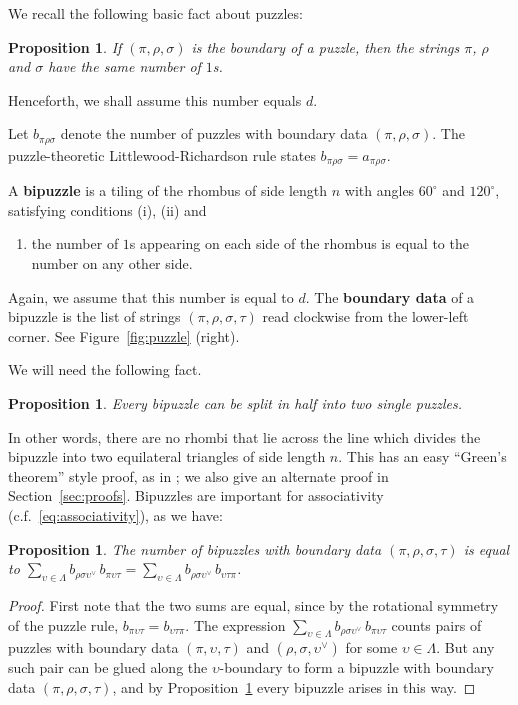 \documentclass[12pt]{article}
\newtheorem{proposition}[lemma]{Proposition}
\begin{document}
We recall the following basic fact about puzzles:
\begin{proposition}
If $(\pi, \rho, \sigma)$ is the boundary of a puzzle, then the
strings $\pi$, $\rho$ and $\sigma$ have the same number of $1$s.
\end{proposition}
Henceforth, we shall assume this number equals $d$.

Let $b_{\pi \rho \sigma}$ denote the number of puzzles with
boundary data $(\pi, \rho, \sigma)$.  The puzzle-theoretic
Littlewood-Richardson rule states
$b_{\pi \rho \sigma} = a_{\pi \rho \sigma}$.

A {\bf bipuzzle} is a tiling of the rhombus of side length
$n$ with angles $60^\circ$ and $120^\circ$, satisfying conditions
(i), (ii) and
\begin{enumerate}
\item[(iii)] the number of $1$s appearing on each side of the rhombus 
is equal to the number on any other side.
\end{enumerate}
Again, we assume that this number is equal to $d$.  
The {\bf boundary data} of a bipuzzle is the list of strings
$(\pi, \rho, \sigma, \tau)$ read clockwise from the lower-left
corner.  See Figure~\ref{fig:puzzle} (right).

We will need the following fact.
\begin{proposition}
\label{prop:bisplit}
Every bipuzzle can be split in half into two single puzzles.
\end{proposition}

In other words, there are no rhombi that lie across the line which 
divides the bipuzzle into two equilateral triangles of side length
$n$.  This has an easy ``Green's theorem'' style proof, as in 
\cite[Lemma 5]{knutson-tao:equiv}; we also give an alternate
proof in Section~\ref{sec:proofs}.  Bipuzzles are important for 
associativity (c.f.~\eqref{eq:associativity}), as we have:

\begin{proposition}
\label{prop:countbipuzzles}
The number of bipuzzles with boundary data 
$(\pi, \rho, \sigma, \tau)$ is equal to
$\sum_{\upsilon \in \Lambda} b_{\rho \sigma \upsilon^\vee} \,
b_{\pi \upsilon \tau} =
\sum_{\upsilon \in \Lambda} b_{\rho \sigma \upsilon^\vee} \,
b_{\upsilon \tau \pi}$.
\end{proposition}

\begin{proof}  First note that the two sums are equal,
since by the rotational symmetry of the puzzle rule,
$b_{\pi \upsilon \tau} = b_{\upsilon \tau \pi}$.  
The expression 
$\sum_{\upsilon \in \Lambda} b_{\rho \sigma \upsilon^\vee} \,
b_{\pi \upsilon \tau}$ counts pairs of puzzles
 with boundary data $(\pi, \upsilon, \tau)$ and 
$(\rho, \sigma, \upsilon^\vee)$ for some $\upsilon \in \Lambda$.
But any such pair can be glued along the
$\upsilon$-boundary to form a bipuzzle with boundary
data $(\pi, \rho, \sigma, \tau)$, and by 
Proposition~\ref{prop:bisplit} every bipuzzle arises 
in this way.  
\end{proof}
\end{document}
